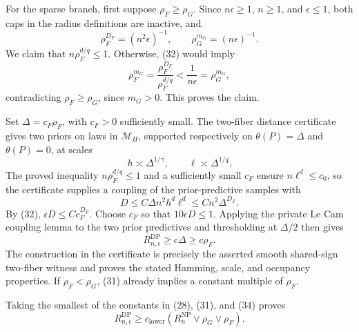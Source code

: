 For the sparse branch, first suppose \(\rho_F\ge\rho_G\).  Since \(n\epsilon\ge1\), \(n\ge1\), and \(\epsilon\le1\), both caps in the radius definitions are inactive, and
\[
 \rho_F^{D_F}=(n^2\epsilon)^{-1},
 \qquad \rho_G^{m_G}=(n\epsilon)^{-1}.
 \tag{32}
\]
We claim that \(n\rho_F^{d/q}\le1\).  Otherwise, (32) would imply
\[
 \rho_F^{m_G}
 =\frac{\rho_F^{D_F}}{\rho_F^{d/q}}
 <\frac1{n\epsilon}
 =\rho_G^{m_G},
\]
contradicting \(\rho_F\ge\rho_G\), since \(m_G>0\).  This proves the claim.

Set \(\Delta=c_F\rho_F\), with \(c_F>0\) sufficiently small.  The two-fiber distance certificate gives two priors on laws in \(\mathcal M_H\), supported respectively on \(\theta(P)=\Delta\) and \(\theta(P)=0\), at scales
\[
 h\asymp\Delta^{1/\gamma},\qquad
 \ell\asymp\Delta^{1/q}.
\]
The proved inequality \(n\rho_F^{d/q}\le1\) and a sufficiently small \(c_F\) ensure \(n\ell^d\le c_0\), so the certificate supplies a coupling of the prior-predictive samples with
\[
 D\le C\Delta n^2h^d\ell^d
 \le Cn^2\Delta^{D_F}.
 \tag{33}
\]
By (32), \(\epsilon D\le Cc_F^{D_F}\).  Choose \(c_F\) so that \(10\epsilon D\le1\).  Applying the private Le Cam coupling lemma to the two prior predictives and thresholding at \(\Delta/2\) then gives
\[
 R_{n,\epsilon}^{\mathrm{DP}}\ge c\Delta\ge c\rho_F.
 \tag{34}
\]
The construction in the certificate is precisely the asserted smooth shared-sign two-fiber witness and proves the stated Hamming, scale, and occupancy properties.  If \(\rho_F<\rho_G\), (31) already implies a constant multiple of \(\rho_F\).

Taking the smallest of the constants in (28), (31), and (34) proves
\[
 R_{n,\epsilon}^{\mathrm{DP}}
 \ge c_{\mathrm{lower}}\left(R_n^{\mathrm{NP}}\vee\rho_G\vee\rho_F\right).
\]
